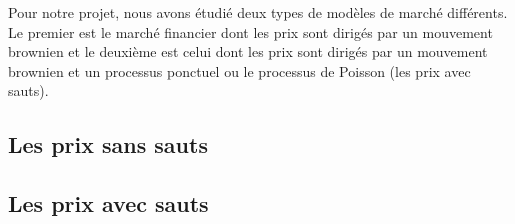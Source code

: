\documentclass[../finalreport.tex]{subfiles}
\begin{document}
Pour notre projet, nous avons étudié deux types de modèles de marché différents. Le premier est le marché financier dont les prix sont dirigés par un mouvement brownien et le deuxième est celui dont les prix sont dirigés par un mouvement brownien et un processus ponctuel ou le processus de Poisson (les prix avec sauts).

\subsection{Les prix sans sauts}


\subsection{Les prix avec sauts}
\end{document}
